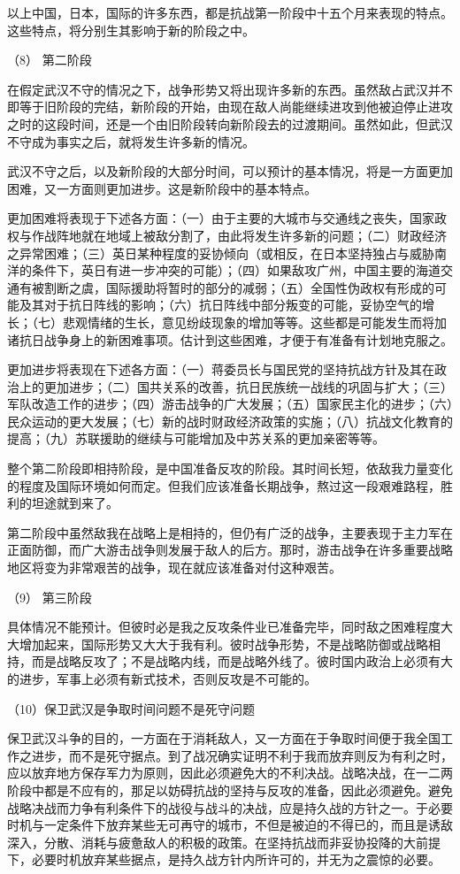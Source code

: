 \documentclass[UTF8, 12pt, a4paper]{ctexrep}
\begin{document}
以上中国，日本，国际的许多东西，都是抗战第一阶段中十五个月来表现的特点。这些特点，将分别生其影响于新的阶段之中。

（8） 第二阶段

在假定武汉不守的情况之下，战争形势又将出现许多新的东西。虽然敌占武汉并不即等于旧阶段的完结，新阶段的开始，由现在敌人尚能继续进攻到他被迫停止进攻之时的这段时间，还是一个由旧阶段转向新阶段去的过渡期间。虽然如此，但武汉不守成为事实之后，就将发生许多新的情况。

武汉不守之后，以及新阶段的大部分时间，可以预计的基本情况，将是一方面更加困难，又一方面则更加进步。这是新阶段中的基本特点。

更加困难将表现于下述各方面：（一）由于主要的大城市与交通线之丧失，国家政权与作战阵地就在地域上被敌分割了，由此将发生许多新的问题；（二）财政经济之异常困难；（三）英日某种程度的妥协倾向（或相反，在日本坚持独占与威胁南洋的条件下，英日有进一步冲突的可能）；（四）如果敌攻广州，中国主要的海道交通有被割断之虞，国际援助将暂时的部分的减弱；（五）全国性伪政权有形成的可能及其对于抗日阵线的影响；（六）抗日阵线中部分叛变的可能，妥协空气的增长；（七）悲观情绪的生长，意见纷歧现象的增加等等。这些都是可能发生而将加诸抗日战争身上的新困难事项。估计到这些困难，才便于有准备有计划地克服之。

更加进步将表现在下述各方面：（一）蒋委员长与国民党的坚持抗战方针及其在政治上的更加进步；（二）国共关系的改善，抗日民族统一战线的巩固与扩大；（三）军队改造工作的进步；（四）游击战争的广大发展；（五）国家民主化的进步；（六）民众运动的更大发展；（七）新的战时财政经济政策的实施；（八）抗战文化教育的提高；（九）苏联援助的继续与可能增加及中苏关系的更加亲密等等。

整个第二阶段即相持阶段，是中国准备反攻的阶段。其时间长短，依敌我力量变化的程度及国际环境如何而定。但我们应该准备长期战争，熬过这一段艰难路程，胜利的坦途就到来了。

第二阶段中虽然敌我在战略上是相持的，但仍有广泛的战争，主要表现于主力军在正面防御，而广大游击战争则发展于敌人的后方。那时，游击战争在许多重要战略地区将变为非常艰苦的战争，现在就应该准备对付这种艰苦。

（9） 第三阶段

具体情况不能预计。但彼时必是我之反攻条件业已准备完毕，同时敌之困难程度大大增加起来，国际形势又大大于我有利。彼时战争形势，不是战略防御或战略相持，而是战略反攻了；不是战略内线，而是战略外线了。彼时国内政治上必须有大的进步，军事上必须有新式技术，否则反攻是不可能的。

（10）保卫武汉是争取时间问题不是死守问题

保卫武汉斗争的目的，一方面在于消耗敌人，又一方面在于争取时间便于我全国工作之进步，而不是死守据点。到了战况确实证明不利于我而放弃则反为有利之时，应以放弃地方保存军力为原则，因此必须避免大的不利决战。战略决战，在一二两阶段中都是不应有的，那足以妨碍抗战的坚持与反攻的准备，因此必须避免。避免战略决战而力争有利条件下的战役与战斗的决战，应是持久战的方针之一。于必要时机与一定条件下放弃某些无可再守的城市，不但是被迫的不得已的，而且是诱敌深入，分散、消耗与疲惫敌人的积极的政策。在坚持抗战而非妥协投降的大前提下，必要时机放弃某些据点，是持久战方针内所许可的，并无为之震惊的必要。
\end{document}
